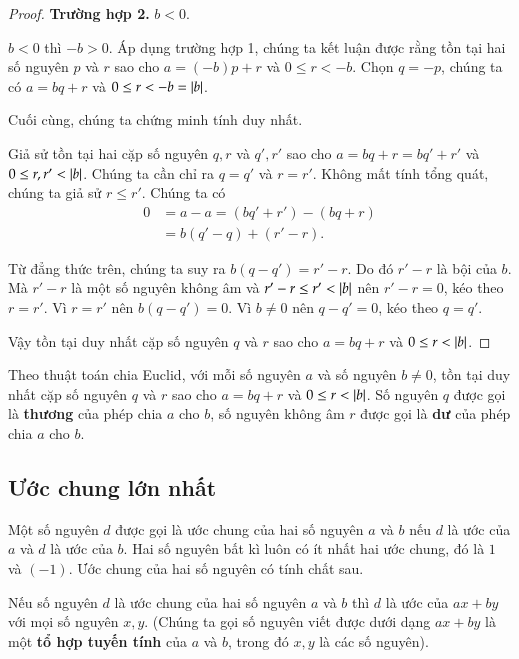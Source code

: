 \begin{proof}
    \textbf{Trường hợp 2.} $b < 0$.

    $b < 0$ thì $-b > 0$. Áp dụng trường hợp 1, chúng ta kết luận được rằng tồn tại hai số nguyên $p$ và $r$ sao cho $a = (-b)p + r$ và $0\leq r < -b$. Chọn $q = -p$, chúng ta có $a = bq + r$ và $0\leq r < -b = \left\vert{b}\right\vert$.

    \bigskip

    Cuối cùng, chúng ta chứng minh tính duy nhất.

    Giả sử tồn tại hai cặp số nguyên $q, r$ và $q', r'$ sao cho $a = bq + r = bq' + r'$ và $0\leq r, r' < \left\vert{b}\right\vert$. Chúng ta cần chỉ ra $q = q'$ và $r = r'$. Không mất tính tổng quát, chúng ta giả sử $r\leq r'$. Chúng ta có
    \begin{align*}
        0 & = a - a = (bq' + r') - (bq + r) \\
          & = b(q' - q) + (r' - r).
    \end{align*}

    Từ đẳng thức trên, chúng ta suy ra $b(q - q') = r' - r$. Do đó $r' - r$ là bội của $b$. Mà $r' - r$ là một số nguyên không âm và $r' - r\leq r' < \left\vert{b}\right\vert$ nên $r' - r = 0$, kéo theo $r = r'$. Vì $r = r'$ nên $b(q - q') = 0$. Vì $b\ne 0$ nên $q - q' = 0$, kéo theo $q = q'$.

    Vậy tồn tại duy nhất cặp số nguyên $q$ và $r$ sao cho $a = bq + r$ và $0\leq r < \left\vert{b}\right\vert$.
\end{proof}

\begin{definition}[Thương và Dư]
    Theo thuật toán chia Euclid, với mỗi số nguyên $a$ và số nguyên $b\ne 0$, tồn tại duy nhất cặp số nguyên $q$ và $r$ sao cho $a = bq + r$ và $0\leq r < \left\vert{b}\right\vert$. Số nguyên $q$ được gọi là \textbf{thương} của phép chia $a$ cho $b$, số nguyên không âm $r$ được gọi là \textbf{dư} của phép chia $a$ cho $b$.
\end{definition}

\subsection{Ước chung lớn nhất}

Một số nguyên $d$ được gọi là ước chung của hai số nguyên $a$ và $b$ nếu $d$ là ước của $a$ và $d$ là ước của $b$. Hai số nguyên bất kì luôn có ít nhất hai ước chung, đó là $1$ và $(-1)$. Ước chung của hai số nguyên có tính chất sau.

\begin{theorem}\label{theorem:linear-combination-and-common-divisor}
    Nếu số nguyên $d$ là ước chung của hai số nguyên $a$ và $b$ thì $d$ là ước của $ax + by$ với mọi số nguyên $x, y$. (Chúng ta gọi số nguyên viết được dưới dạng $ax + by$ là một \textbf{tổ hợp tuyến tính} của $a$ và $b$, trong đó $x, y$ là các số nguyên).
\end{theorem}

